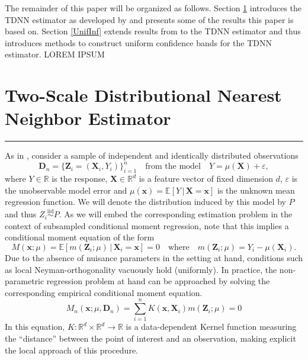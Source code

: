 \documentclass[letterpaper,10pt]{article}
\numberwithin{equation}{section}
\numberwithin{theorem}{section}
\theoremstyle{definition}
\newcommand{\1}{\mathbb{1}}
\begin{document}
The remainder of this paper will be organized as follows.
Section \ref{TDNN} introduces the TDNN estimator as developed by \citet{demirkaya_optimal_2024} and presents some of the results this paper is based on.
Section \ref{UnifInf} extends results from \citet{ritzwoller_uniform_2024} to the TDNN estimator and thus introduces methods to construct uniform confidence bands for the TDNN estimator.
	{\color{red} LOREM IPSUM}

\section{Two-Scale Distributional Nearest Neighbor Estimator}\label{TDNN}
\hrule
As in \citet{demirkaya_optimal_2024}, consider a sample of independent and identically distributed observations
\begin{equation}\label{DGP}
	\mathbf{D}_n = \{\mathbf{Z}_i = (\mathbf{X}_i, Y_i)\}_{i = 1}^{n}
	\quad \text{from the model} \quad
	Y = \mu(\mathbf{X}) + \varepsilon,
\end{equation}
where $Y \in \mathbb{R}$ is the response, $\mathbf{X} \in \mathbb{R}^d$ is a feature vector of fixed dimension $d$, $\varepsilon$ is the unobservable model error and $\mu(\mathbf{x}) = \mathbb{E}\left[Y \, | \, \mathbf{X} = \mathbf{x}\right]$ is the unknown mean regression function.
We will denote the distribution induced by this model by $P$ and thus $Z_i \overset{\text{iid}}{\sim} P$.
As we will embed the corresponding estimation problem in the context of subsampled conditional moment regression, note that this implies a conditional moment equation of the form
\begin{equation}\label{CondMomEq}
	M(\mathbf{x}; \mu)
	= \mathbb{E}\left[m(\mathbf{Z}_i; \mu) \, | \, \mathbf{X}_i = \mathbf{x}\right]
	= 0
	\quad \text{where} \quad
	m(\mathbf{Z}_i; \mu) = Y_i - \mu(\mathbf{X}_i).
\end{equation}
Due to the absence of nuisance parameters in the setting at hand, conditions such as local Neyman-orthogonality vacuously hold (uniformly).
In practice, the non-parametric regression problem at hand can be approached by solving the corresponding empirical conditional moment equation.
\begin{equation}\label{EmpCondMomEq}
	M_n(\mathbf{x}; \mu, \mathbf{D}_n)
	= \sum_{i = 1}^{n}K(\mathbf{x}, \mathbf{X}_i)m(\mathbf{Z}_i; \mu)
	= 0
\end{equation}
In this equation, $K:\mathbb{R}^d \times \mathbb{R}^d \rightarrow \mathbb{R}$ is a data-dependent Kernel function measuring the ``distance'' between the point of interest and an observation, making explicit the local approach of this procedure.
\end{document}
